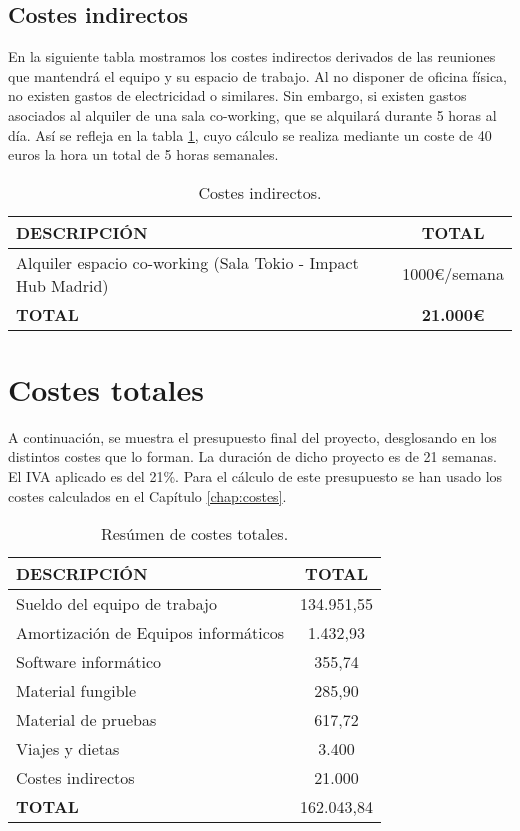 \subsection{Costes indirectos}
En la siguiente tabla mostramos los costes indirectos derivados de las reuniones que mantendrá el equipo y su espacio de trabajo. Al no disponer de oficina física, no existen gastos de electricidad o similares. Sin embargo, si existen gastos asociados al alquiler de una sala co-working, que se alquilará durante 5 horas al día. Así se refleja en la tabla \ref{tab:indirectos}, cuyo cálculo se realiza mediante un coste de 40 euros la hora un total de 5 horas semanales.

\begin{table}[H]
\begin{center}
\begin{tabular}{l c}
\textbf{DESCRIPCIÓN} & \textbf{TOTAL}\\ \hline \hline
Alquiler espacio co-working (Sala Tokio - Impact Hub Madrid) & 1000\euro/semana\\ \hline \hline
\textbf{TOTAL} & \textbf{21.000\euro}\\ \hline
\end{tabular}
\caption{Costes indirectos.}
\label{tab:indirectos}
\end{center}
\end{table}


\section{Costes totales}
\par A continuación, se muestra el presupuesto final del proyecto, desglosando en los distintos costes que lo forman. La duración de dicho proyecto es de 21 semanas. El IVA aplicado es del 21\%. Para el cálculo de este presupuesto se han usado los costes calculados en el Capítulo \ref{chap:costes}.

\begin{table}[H]
\begin{center}
\begin{tabular}{l c}
\textbf{DESCRIPCIÓN} & \textbf{TOTAL}\\ \hline \hline
Sueldo del equipo de trabajo & 134.951,55\\
Amortización de Equipos informáticos & 1.432,93\\
Software informático & 355,74\\
Material fungible & 285,90\\
Material de pruebas & 617,72\\
Viajes y dietas & 3.400\\
Costes indirectos & 21.000\\ \hline \hline
\textbf{TOTAL} & 162.043,84\\ \hline
\end{tabular}
\caption{Resúmen de costes totales.}
\label{tab:resumenTotal}
\end{center}
\end{table}

